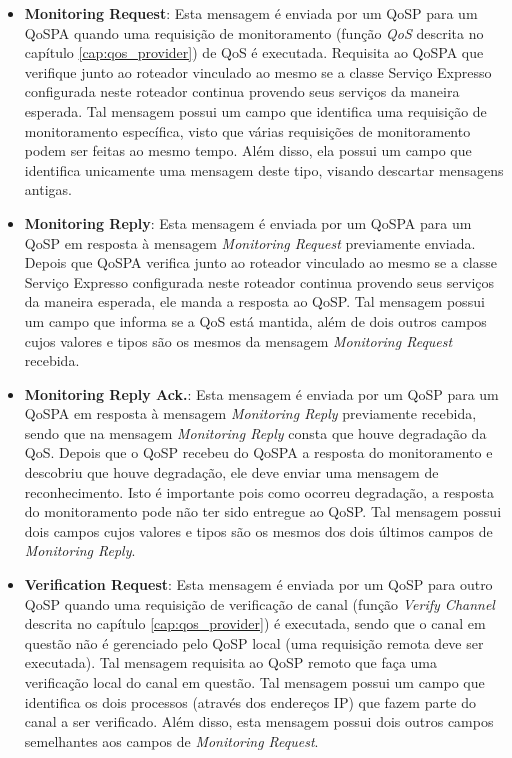 \begin{itemize}
\item \textbf{Monitoring Request}: Esta mensagem é enviada por um QoSP para um QoSPA quando uma requisição de monitoramento (função \textit{QoS} descrita no capítulo \ref{cap:qos_provider}) de QoS é executada. Requisita ao QoSPA que verifique junto ao roteador vinculado ao mesmo se a classe Serviço Expresso configurada neste roteador continua provendo seus serviços da maneira esperada. Tal mensagem possui um campo que identifica uma requisição de monitoramento específica, visto que várias requisições de monitoramento podem ser feitas ao mesmo tempo. Além disso, ela possui um campo que identifica unicamente uma mensagem deste tipo, visando descartar mensagens antigas.

\item \textbf{Monitoring Reply}: Esta mensagem é enviada por um QoSPA para um QoSP em resposta à mensagem \textit{Monitoring Request} previamente enviada. Depois que QoSPA verifica junto ao roteador vinculado ao mesmo se a classe Serviço Expresso configurada neste roteador continua provendo seus serviços da maneira esperada, ele manda a resposta ao QoSP. Tal mensagem possui um campo que informa se a QoS está mantida, além de dois outros campos cujos valores e tipos são os mesmos da mensagem \textit{Monitoring Request} recebida.

\item \textbf{Monitoring Reply Ack.}: Esta mensagem é enviada por um QoSP para um QoSPA em resposta à mensagem \textit{Monitoring Reply} previamente recebida, sendo que na mensagem \textit{Monitoring Reply} consta que houve degradação da QoS. Depois que o QoSP recebeu do QoSPA a resposta do monitoramento e descobriu que houve degradação, ele deve enviar uma mensagem de reconhecimento. Isto é importante pois como ocorreu degradação, a resposta do monitoramento pode não ter sido entregue ao QoSP. Tal mensagem possui dois campos cujos valores e tipos são os mesmos dos dois últimos campos de \textit{Monitoring Reply}.

\item \textbf{Verification Request}: Esta mensagem é enviada por um QoSP para outro QoSP quando uma requisição de verificação de canal (função \textit{Verify Channel} descrita no capítulo \ref{cap:qos_provider}) é executada, sendo que o canal em questão não é gerenciado pelo QoSP local (uma requisição remota deve ser executada). Tal mensagem requisita ao QoSP remoto que faça uma verificação local do canal em questão. Tal mensagem possui um campo que identifica os dois processos (através dos endereços IP) que fazem parte do canal a ser verificado. Além disso, esta mensagem possui dois outros campos semelhantes aos campos  de \textit{Monitoring Request}.


\end{itemize}
